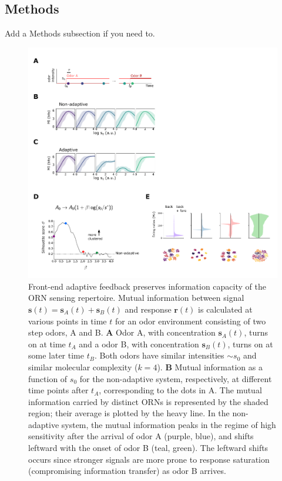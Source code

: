 \documentclass[9pt,twoside]{pnas-new}
\begin{document}
\subsection*{Methods}
Add a Methods subsection if you need to.
\fi





\begin{figure}
\centering
\includegraphics[width=\linewidth]{figures/2_coding_representation_SI}
\caption{Front-end adaptive feedback preserves information capacity of the ORN sensing repertoire. Mutual information between signal $\mathbf s(t)=\mathbf s_A(t)+\mathbf s_B(t)$ and response $\mathbf r(t)$ is calculated at various points in time $t$ for an odor environment consisting of two step odors, A and B. 
\textbf{A} Odor A, with concentration $\mathbf s_A(t)$, turns on at time $t_A$ and a odor B, with concentration $\mathbf s_B(t)$, turns on at some later time $t_B$. Both odors have similar intensities $\sim s_0$ and similar molecular complexity ($k = 4$). 
\textbf{B} Mutual information as a function of $s_0$ for the non-adaptive system, respectively, at different time points after $t_A$, corresponding to the dots in A. The mutual information carried by distinct ORNs is represented by the shaded region; their average is plotted by the heavy line. In the non-adaptive system, the mutual information peaks in the regime of high sensitivity after the arrival of odor A (purple, blue), and shifts leftward with the onset of odor B (teal, green). The leftward shifts occurs since stronger signals are more prone to response saturation (compromising information transfer) as odor B arrives. 
}
\end{figure}
\end{document}
